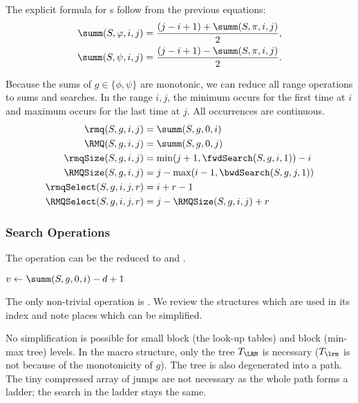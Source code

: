 The explicit formula for \summ{}s follow from the previous equations:
\begin{align*}
	\summ(S, \phi, i, j) &= \frac{(j - i + 1) + \summ(S, \pi, i, j)}{2}, \\
	\summ(S, \psi, i, j) &= \frac{(j - i + 1) - \summ(S, \pi, i, j)}{2}.
\end{align*}

Because the sums of $g \in \{\phi, \psi \}$ are monotonic, we can reduce all range operations to sums and searches.
In the range $i, j$, the minimum occurs for the first time at $i$ and maximum occurs for the last time at $j$.
All occurrences are continuous.
\begin{align*}
	\rmq(S, g, i, j) &= \summ(S, g, 0, i) \\
	\RMQ(S, g, i, j) &= \summ(S, g, 0, j) \\
	\rmqSize(S, g, i, j) &= \min(j + 1, \fwdSearch(S, g, i, 1)) - i \\
	\RMQSize(S, g, i, j) &= j - \max(i - 1, \bwdSearch(S, g, j, 1)) \\
	\rmqSelect(S, g, i, j, r) &= i + r - 1 \\ 
	\RMQSelect(S, g, i, j, r) &= j - \RMQSize(S, g, i, j) + r
\end{align*}

\subsubsection{Search Operations}

The operation \bwdSearch{} can be the reduced to \fwdSearch{} and \summ{}.

\begin{algorithm}
\begin{algorithmic}
		\State $v \gets \summ(S, g, 0, i) - d + 1$
			\State {}
			\State {}
		\Else
			\State {}
		\EndIf
		\State {}
	\Else
		\State {}
	\EndIf
\EndFunction
\end{algorithmic}
\end{algorithm}

The only non-trivial operation is \fwdSearch{}.
We review the structures which are used in its index and note places which can be simplified.

No simplification is possible for small block (the look-up tables) and block (min-max tree) levels.
In the macro structure, only the tree $T_{\LRM}$ is necessary ($T_{\lrm}$ is not because of the monotonicity of $g$).
The tree is also degenerated into a path.
The tiny compressed array of jumps are not necessary as the whole path forms a ladder; the search in the ladder stays the same.

